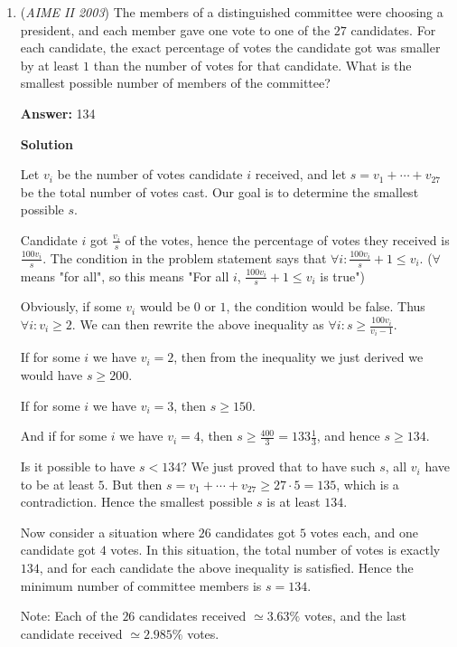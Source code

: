 \begin{enumerate}
	\item (\textit{AIME II 2003}) The members of a distinguished committee were choosing a president, and each member gave one vote to one of the $27$ candidates. For each candidate, the exact percentage of votes the candidate got was smaller by at least $1$ than the number of votes for that candidate. What is the smallest possible number of members of the committee?


 
 \textbf{Answer: }134



\textbf{Solution}

Let $v_i$ be the number of votes candidate $i$ received, and let $s=v_1+\cdots+v_{27}$ be the total number of votes cast. Our goal is to determine the smallest possible $s$.

 Candidate $i$ got $\frac{v_i}s$ of the votes, hence the percentage of votes they received is $\frac{100v_i}s$. The condition in the problem statement says that $\forall i: \frac{100v_i}s + 1 \leq v_i$.  ($\forall$ means "for all", so this means "For all $i$, $\frac{100v_i}s + 1 \leq v_i$ is true")

 Obviously, if some $v_i$ would be $0$ or $1$, the condition would be false. Thus $\forall i: v_i\geq 2$. We can then rewrite the above inequality as $\forall i: s\geq\frac{100v_i}{v_i-1}$. 

 If for some $i$ we have $v_i=2$, then from the inequality we just derived we would have $s\geq 200$.

 If for some $i$ we have $v_i=3$, then $s\geq 150$.

 And if for some $i$ we have $v_i=4$, then $s\geq \frac{400}3 = 133\frac13$, and hence $s\geq 134$.

 Is it possible to have $s<134$? We just proved that to have such $s$, all $v_i$ have to be at least $5$. But then $s=v_1+\cdots+v_{27}\geq 27\cdot 5 = 135$, which is a contradiction. Hence the smallest possible $s$ is at least $134$.

 Now consider a situation where $26$ candidates got $5$ votes each, and one candidate got $4$ votes. In this situation, the total number of votes is exactly $134$, and for each candidate the above inequality is satisfied. Hence the minimum number of committee members is $s=\boxed{134}$.

 Note: Each of the $26$ candidates received $\simeq 3.63\%$ votes, and the last candidate received $\simeq 2.985\%$ votes.

 




\end{enumerate}
